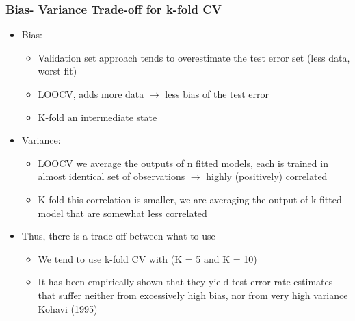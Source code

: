 \documentclass[
  shownotes,
  xcolor={svgnames},
  hyperref={colorlinks,citecolor=DarkBlue,linkcolor=DarkRed,urlcolor=DarkBlue}
  ]{beamer}
\begin{document}
\begin{frame}[fragile]
\frametitle{Bias- Variance Trade-off for k-fold CV}

\begin{itemize}
  \item Bias:
  \medskip
    \begin{itemize}
      \item Validation set approach tends to overestimate the test error set (less data, worst fit)
      \item LOOCV, adds more data $\rightarrow$ less bias of the test error
      \item K-fold an intermediate state
    \end{itemize}
    \item Variance:
    \begin{itemize}
      \item LOOCV we average the outputs of n fitted models, each is trained in almost identical set of observations $\rightarrow$ highly (positively) correlated
      \item K-fold this correlation is smaller, we are averaging the output of k fitted model that are somewhat less correlated
    \end{itemize}
    \medskip
  \item Thus, there is a trade-off between what to use
  \medskip
    \begin{itemize}
      \item We tend to use k-fold CV with (K = 5 and K = 10)
      \item It has been empirically shown that they yield test error rate estimates that suffer neither from excessively high bias, nor from very high variance Kohavi (1995)
    \end{itemize}
\end{itemize}


\end{frame}
\end{document}
